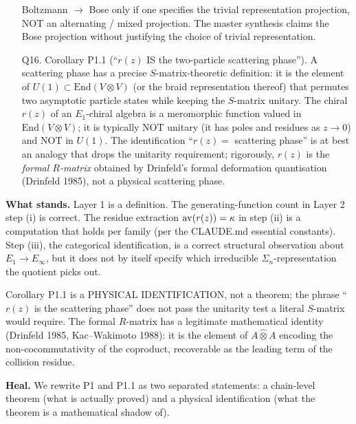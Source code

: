 \begin{enumerate}
Boltzmann $\to$ Bose only if one specifies the trivial representation
projection, NOT an alternating / mixed projection. The master synthesis
claims the Bose projection without justifying the choice of trivial
representation.
\item[Q16.] Corollary P1.1 (``$r(z)$ IS the two-particle scattering
phase''). A scattering phase has a precise $S$-matrix-theoretic
definition: it is the element of $U(1) \subset \mathrm{End}(V \otimes V)$
(or the braid representation thereof) that permutes two asymptotic
particle states while keeping the $S$-matrix unitary. The chiral
$r(z)$ of an $E_1$-chiral algebra is a meromorphic function valued in
$\mathrm{End}(V \otimes V)$; it is typically NOT unitary (it has poles
and residues as $z \to 0$) and NOT in $U(1)$. The identification
``$r(z) = $ scattering phase'' is at best an analogy that drops the
unitarity requirement; rigorously, $r(z)$ is the \emph{formal
$R$-matrix} obtained by Drinfeld's formal deformation quantisation
(Drinfeld 1985), not a physical scattering phase.
\end{enumerate}

\textbf{What stands.} Layer 1 is a definition. The generating-function
count in Layer 2 step (i) is correct. The residue extraction
$\mathrm{av}(r(z)) = \kappa$ in step (ii) is a computation that holds per
family (per the CLAUDE.md essential constants). Step (iii), the
categorical identification, is a correct structural observation about
$E_1 \to E_\infty$, but it does not by itself specify which irreducible
$\Sigma_n$-representation the quotient picks out.

Corollary P1.1 is a PHYSICAL IDENTIFICATION, not a theorem; the phrase
``$r(z)$ is the scattering phase'' does not pass the unitarity test a
literal $S$-matrix would require. The formal $R$-matrix has a
legitimate mathematical identity (Drinfeld 1985, Kac--Wakimoto 1988):
it is the element of
$A \hat\otimes A$ encoding the non-cocommutativity of the coproduct,
recoverable as the leading term of the collision residue.

\textbf{Heal.} We rewrite P1 and P1.1 as two separated statements: a
chain-level theorem (what is actually proved) and a physical
identification (what the theorem is a mathematical shadow of).

